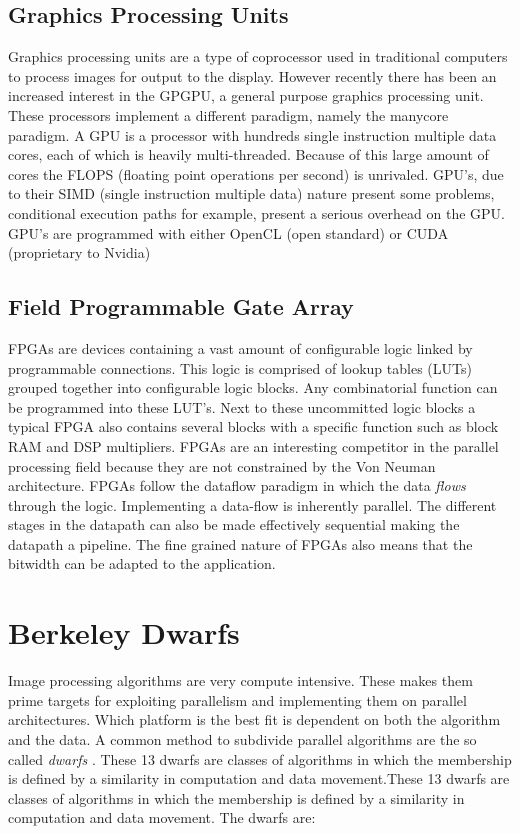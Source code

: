 \subsection{Graphics Processing Units} 
Graphics processing units are a type of coprocessor used in traditional computers to process images for output to the display. However recently there has been an increased interest in the GPGPU, a general purpose graphics processing unit. These processors implement a different paradigm, namely the manycore paradigm. A  GPU is a processor with hundreds single instruction multiple data cores, each of which is heavily multi-threaded. Because of this large amount of cores the FLOPS (floating point operations per second) is unrivaled\cite{kirk_programming_2010}. GPU's, due to their SIMD (single instruction multiple data) nature present some problems, conditional execution paths for example, present a serious overhead on the GPU. GPU's are programmed with either OpenCL (open standard) or CUDA (proprietary to Nvidia)

\subsection{Field Programmable Gate Array} 
FPGAs are devices containing a vast amount of configurable logic linked by programmable connections. This logic is comprised of lookup tables (LUTs) grouped together into configurable logic blocks. Any combinatorial function can be programmed into these LUT's. Next to these uncommitted logic blocks a typical FPGA also contains several blocks with a specific function such as block RAM and DSP multipliers. FPGAs are an interesting competitor in the parallel processing field because they are not constrained by the Von Neuman architecture. FPGAs follow the dataflow paradigm in which the data \emph{flows} through the logic. Implementing a data-flow is inherently parallel. The different stages in the datapath can also be made effectively sequential making the datapath a pipeline. The fine grained nature of FPGAs also means that the bitwidth can be adapted to the application.


\section{Berkeley Dwarfs }

Image processing algorithms are very compute intensive. These makes them prime targets for exploiting parallelism and implementing them on parallel architectures. Which platform is the best fit is dependent on both the algorithm and the data. A common method to subdivide parallel algorithms are the so called \emph{dwarfs} \cite{asanovic_landscape_????}. These 13 dwarfs are classes of algorithms in which the membership is defined by a similarity in computation and data movement.These 13 dwarfs are classes of algorithms in which the membership is defined by a similarity in computation and data movement.
The dwarfs are:

